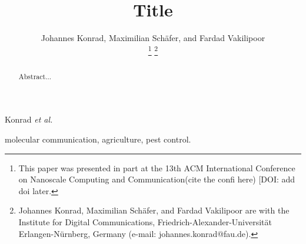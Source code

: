 \documentclass[journal]{IEEEtran}
\begin{document}
\title{Title}
%
\author{
    Johannes Konrad,
    Maximilian Schäfer, and
    Fardad Vakilipoor
    \\
\thanks{This paper was presented in part at the 13th ACM International Conference on Nanoscale Computing and Communication(cite the confi here) [DOI: add doi later.}
\thanks{Johannes Konrad,
    Maximilian Sch\"afer, and
    Fardad Vakilipoor are with the Institute for Digital Communications, Friedrich-Alexander-Universität Erlangen-Nürnberg, Germany (e-mail: johannes.konrad@fau.de).}}

% 
%


%
{Konrad \MakeLowercase{\emph{et al.}}}

\maketitle

\begin{abstract}
%
Abstract...
\end{abstract}
\begin{IEEEkeywords}
molecular communication, agriculture, pest control.
\end{IEEEkeywords}
\acresetall
\IEEEpeerreviewmaketitle
\end{document}

